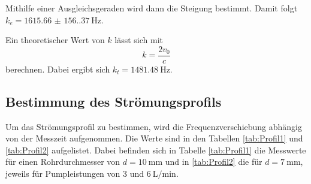 \noindent Mithilfe einer Ausgleichsgeraden wird dann die Steigung bestimmt.
Damit folgt $k_e=\qty{1615.66(156.37)}{\hertz}$.


Ein theoretischer Wert von $k$ lässt sich mit 
\begin{equation*}
  k=\frac{2 v_0}{c}
\end{equation*}
\noindent berechnen. 
Dabei ergibt sich $k_t=\qty{1481.48}{\hertz}$.


\subsection{Bestimmung des Strömungsprofils}

Um das Strömungsprofil zu bestimmen, wird die Frequenzverschiebung abhängig von der Messzeit aufgenommen.
Die Werte sind in den Tabellen \ref{tab:Profil1} und \ref{tab:Profil2} aufgelistet.
Dabei befinden sich in Tabelle \ref{tab:Profil1} die Messwerte für einen Rohrdurchmesser von $d=\qty{10}{\milli\meter}$ und in \ref{tab:Profil2} 
die für $d=\qty{7}{\milli\meter}$, jeweils für Pumpleistungen von $3$ und $\qty{6}{\liter\per\minute}$.

